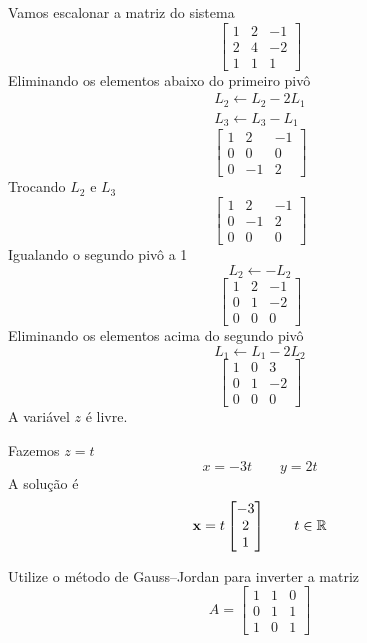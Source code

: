 \documentclass[a4paper,12pt,fleqn]{article}
\begin{document}
\begin{answer}
Vamos escalonar a matriz do sistema
\[
  \begin{bmatrix}
    1 & 2 & -1 \\
    2 & 4 & -2 \\
    1 & 1 &  1
  \end{bmatrix}
\]
Eliminando os elementos abaixo do primeiro pivô
\begin{gather*}
  L_2 \leftarrow L_2 - 2 L_1 \\
  L_3 \leftarrow L_3 - L_1
\end{gather*}
\[
\begin{bmatrix}
  1 & 2  & -1 \\
  0 & 0  & 0  \\
  0 & -1 & 2
\end{bmatrix}
\]
Trocando $L_2$ e $L_3$
\[
\begin{bmatrix}
  1 & 2  & -1 \\
  0 & -1 & 2  \\
  0 & 0  & 0
\end{bmatrix}
\]
Igualando o segundo pivô a 1
\[
  L_2 \leftarrow - L_2
\]
\[
\begin{bmatrix}
  1 & 2 & -1 \\
  0 & 1 & -2 \\
  0 & 0 & 0
\end{bmatrix}
\]
Eliminando os elementos acima do segundo pivô
\[
  L_1 \leftarrow L_1 - 2 L_2
\]
\[
\begin{bmatrix}
  1 & 0 &  3 \\
  0 & 1 & -2 \\
  0 & 0 &  0
\end{bmatrix}
\]
A variável $z$ é livre.

Fazemos $z=t$
\[
  x= -3t
  \qquad
  y = 2t
\]
A solução é
\[
  \mathbf{x}
  =
  t\begin{bmatrix}
    -3 \\
    2  \\
    1
  \end{bmatrix}
  \qquad t \in \mathbb{R}
\]
\end{answer}

Utilize o método de Gauss--Jordan para inverter a matriz
\[
  A =
  \begin{bmatrix}
    1 & 1 & 0 \\
    0 & 1 & 1 \\
    1 & 0 & 1
  \end{bmatrix}
\]
\end{document}
